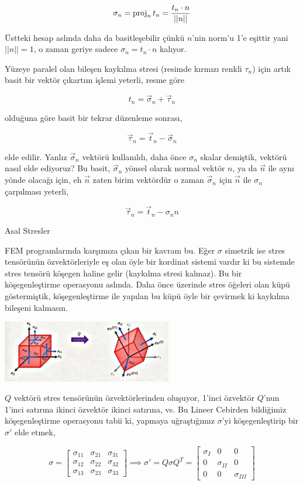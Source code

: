 \documentclass[12pt,fleqn]{article}\usepackage{../../common}
\begin{document}
$$
\sigma_n = \operatorname{proj}_n t_n = \frac{t_n \cdot n}{||n||}
$$

Üstteki hesap aslında daha da basitleşebilir çünkü $n$'nin norm'u 1'e
eşittir yani $||n||=1$, o zaman geriye sadece $\sigma_n = t_n \cdot n$
kalıyor.

Yüzeye paralel olan bileşen kaykılma stresi (resimde kırmızı renkli $\tau_n$)
için artık basit bir vektör çıkartım işlemi yeterli, resme göre

$$
t_n = \vec{\sigma}_n + \vec{\tau}_n 
$$

olduğuna göre basit bir tekrar düzenleme sonrası,

$$
\vec{\tau}_n  = \vec{t}_n - \vec{\sigma}_n 
$$

elde edilir. Yanlız $\vec{\sigma}_n$ vektörü kullanıldı, daha önce $\sigma_n$
skalar demiştik, vektörü nasıl elde ediyoruz? Bu basit, $\vec{\sigma}_n$
yönsel olarak normal vektör $n$, ya da $\vec{n}$ ile aynı yönde olacağı
için, eh $\vec{n}$ zaten birim vektördür o zaman $\vec{\sigma}_n$ için
$\vec{n}$ ile $\sigma_n$ çarpılması yeterli,

$$
\vec{\tau}_n  = \vec{t}_n - \sigma_n n
$$

Asal Stresler

FEM programlarında karşımıza çıkan bir kavram bu. Eğer $\sigma$ simetrik ise
stres tensörünün özvektörleriyle eş olan öyle bir kordinat sistemi vardır ki bu
sistemde stres tensörü köşegen haline gelir (kaykılma stresi kalmaz). Bu bir
köşegenleştirme operasyonu aslında.  Daha önce üzerinde stres öğeleri olan küpü
göstermiştik, köşegenleştirme ile yapılan bu küpü öyle bir çevirmek ki kaykılma
bileşeni kalmasın.

\includegraphics[width=20em]{phy_020_strs_02_08.jpg}

$Q$ vektörü stres tensörünün özvektörlerinden oluşuyor, 1'inci özvektör $Q$'nun
1'inci satırına ikinci özvektör ikinci satırına, vs. Bu Lineer Cebirden
bildiğimiz köşegenleştirme operasyonu tabii ki, yapmaya uğraştığımız $\sigma$'yi
köşegenleştirip bir $\sigma'$ elde etmek,

$$
\sigma = 
\left[\begin{array}{ccc}
\sigma_{11} & \sigma_{21} & \sigma_{31} \\
\sigma_{12} & \sigma_{22} & \sigma_{32} \\
\sigma_{13} & \sigma_{23} & \sigma_{33} 
\end{array}\right] \implies
\sigma' = Q \sigma Q^T =
\left[\begin{array}{ccc}
\sigma_I & 0           & 0 \\
0        & \sigma_{II} & 0 \\
0        & 0           & \sigma_{III}
\end{array}\right]
$$
\end{document}
